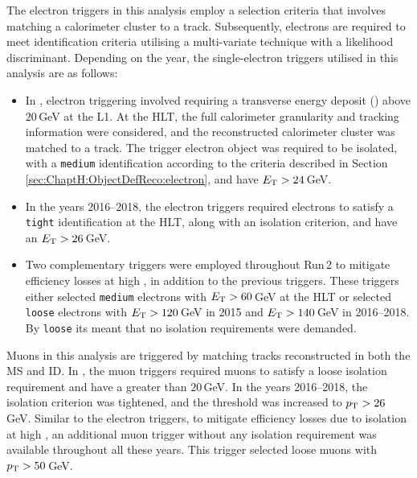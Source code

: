 The electron triggers in this analysis employ a selection criteria that involves matching a calorimeter cluster to a track. 
Subsequently, electrons are required to meet identification criteria utilising a multi-variate technique with a likelihood discriminant.
Depending on the year, the single-electron triggers utilised in this analysis are as follows:
\begin{itemize}
	\item In \datafirstyear, electron triggering involved requiring a transverse energy deposit (\ET) above $20\,$GeV at the L1. 
	At the HLT, the full calorimeter granularity and tracking information were considered, and the reconstructed calorimeter
	cluster was matched to a track. The trigger electron object was required to be isolated, with a \texttt{medium} identification 
	according to the criteria described in Section \ref{sec:ChaptH:ObjectDefReco:electron}, and have $E_{\text{T}} > 24\,$GeV.
	\item In the years 2016--2018, the electron triggers required electrons to satisfy a \texttt{tight} identification at the HLT, 
	along with an isolation criterion, and have an $E_{\text{T}} > 26\,$GeV.
	\item Two complementary triggers were employed throughout Run$\,$2 to mitigate efficiency losses at high \pT, 
	in addition to the previous triggers. These triggers either selected \texttt{medium} electrons with $E_{\text{T}} > 60\,$GeV 
	at the HLT or selected \texttt{loose} electrons with $E_{\text{T}} > 120\,$GeV in 2015 and 
	$E_{\text{T}} > 140\,$GeV in 2016--2018. By \texttt{loose} its meant that no isolation requirements were demanded.
\end{itemize}

Muons in this analysis are triggered by matching tracks reconstructed in both the MS and ID.
In \datafirstyear, the muon triggers required muons to satisfy a loose isolation requirement and
have a \pT greater than $20\,$GeV. In the years 2016--2018, the isolation criterion was tightened, 
and the threshold was increased to $p_{\text{T}} > 26\,$GeV.
Similar to the electron triggers, to mitigate efficiency losses due to isolation at high \pT, an additional 
muon trigger without any isolation requirement was available throughout all these years. 
This trigger selected loose muons with $p_{\text{T}} > 50\,$GeV.

%
%
